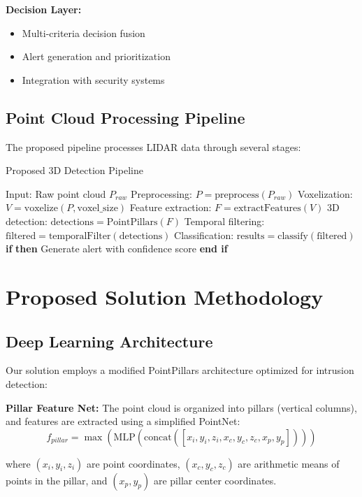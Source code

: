 \documentclass[conference]{IEEEtran}
\begin{document}
\textbf{Decision Layer:}
\begin{itemize}
\item Multi-criteria decision fusion
\item Alert generation and prioritization
\item Integration with security systems
\end{itemize}

\subsection{Point Cloud Processing Pipeline}
The proposed pipeline processes LIDAR data through several stages:

\begin{algorithm}
\caption{Proposed 3D Detection Pipeline}
\begin{algorithmic}[1]
\STATE Input: Raw point cloud $P_{raw}$
\STATE Preprocessing: $P = \text{preprocess}(P_{raw})$
\STATE Voxelization: $V = \text{voxelize}(P, \text{voxel\_size})$
\STATE Feature extraction: $F = \text{extractFeatures}(V)$
\STATE 3D detection: $\text{detections} = \text{PointPillars}(F)$
\STATE Temporal filtering: $\text{filtered} = \text{temporalFilter}(\text{detections})$
\STATE Classification: $\text{results} = \text{classify}(\text{filtered})$
\STATE \textbf{if}  \textbf{then}
\STATE \quad Generate alert with confidence score
\STATE \textbf{end if}
\end{algorithmic}
\end{algorithm}

\section{Proposed Solution Methodology}
\subsection{Deep Learning Architecture}
Our solution employs a modified PointPillars architecture optimized for intrusion detection:

\textbf{Pillar Feature Net:}
The point cloud is organized into pillars (vertical columns), and features are extracted using a simplified PointNet:
\begin{equation}
f_{pillar} = \max(\text{MLP}(\text{concat}([x_i, y_i, z_i, x_c, y_c, z_c, x_p, y_p])))
\end{equation}

where $(x_i, y_i, z_i)$ are point coordinates, $(x_c, y_c, z_c)$ are arithmetic means of points in the pillar, and $(x_p, y_p)$ are pillar center coordinates.
\end{document}
